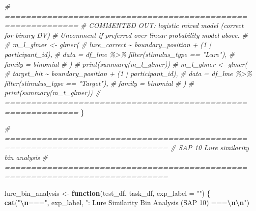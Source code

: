 \documentclass[
]{article}
\newenvironment{Shaded}{\begin{snugshade}}{\end{snugshade}}
\newcommand{\AttributeTok}[1]{\textcolor[rgb]{0.13,0.29,0.53}{#1}}
\newcommand{\CommentTok}[1]{\textcolor[rgb]{0.56,0.35,0.01}{\textit{#1}}}
\newcommand{\ControlFlowTok}[1]{\textcolor[rgb]{0.13,0.29,0.53}{\textbf{#1}}}
\newcommand{\FunctionTok}[1]{\textcolor[rgb]{0.13,0.29,0.53}{\textbf{#1}}}
\newcommand{\NormalTok}[1]{#1}
\newcommand{\OtherTok}[1]{\textcolor[rgb]{0.56,0.35,0.01}{#1}}
\newcommand{\SpecialCharTok}[1]{\textcolor[rgb]{0.81,0.36,0.00}{\textbf{#1}}}
\newcommand{\StringTok}[1]{\textcolor[rgb]{0.31,0.60,0.02}{#1}}
\begin{document}
\begin{Shaded}
\begin{Highlighting}[]
  \CommentTok{\# ============================================================}
  \CommentTok{\# COMMENTED OUT: logistic mixed model (correct for binary DV)}
  \CommentTok{\# Uncomment if preferred over linear probability model above.}
  \CommentTok{\#}
  \CommentTok{\# m\_l\_glmer \textless{}{-} glmer(}
  \CommentTok{\#   lure\_correct \textasciitilde{} boundary\_position + (1 | participant\_id),}
  \CommentTok{\#   data   = df\_lme \%\textgreater{}\% filter(stimulus\_type == "Lure"),}
  \CommentTok{\#   family = binomial}
  \CommentTok{\# )}
  \CommentTok{\# print(summary(m\_l\_glmer))}
  \CommentTok{\# m\_t\_glmer \textless{}{-} glmer(}
  \CommentTok{\#   target\_hit \textasciitilde{} boundary\_position + (1 | participant\_id),}
  \CommentTok{\#   data   = df\_lme \%\textgreater{}\% filter(stimulus\_type == "Target"),}
  \CommentTok{\#   family = binomial}
  \CommentTok{\# )}
  \CommentTok{\# print(summary(m\_t\_glmer))}
  \CommentTok{\# ============================================================}
\NormalTok{\}}

\CommentTok{\# =============================================================================}
\CommentTok{\# SAP 10  Lure similarity bin analysis}
\CommentTok{\# =============================================================================}

\NormalTok{lure\_bin\_analysis }\OtherTok{\textless{}{-}} \ControlFlowTok{function}\NormalTok{(test\_df, task\_df, }\AttributeTok{exp\_label =} \StringTok{""}\NormalTok{) \{}
  \FunctionTok{cat}\NormalTok{(}\StringTok{"}\SpecialCharTok{\textbackslash{}n}\StringTok{==="}\NormalTok{, exp\_label, }\StringTok{": Lure Similarity Bin Analysis (SAP 10) ===}\SpecialCharTok{\textbackslash{}n\textbackslash{}n}\StringTok{"}\NormalTok{)}


\end{Highlighting}
\end{Shaded}
\end{document}

